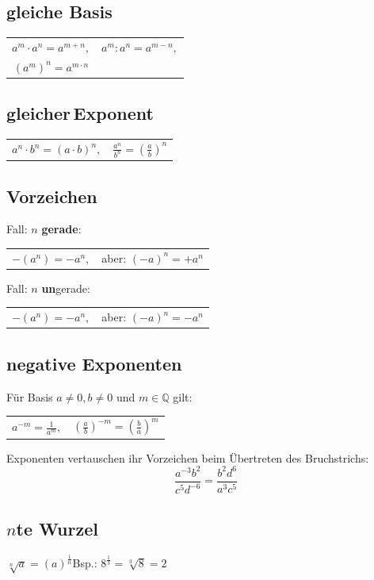 \begin{multicols}{2}
\subsection*{gleiche Basis}
\begin{tabular}{cc}
$a^m\cdot{}a^n = a^{m+n},$ & $a^m:a^n=a^{m-n},$ \\
$\left(a^m\right)^n = a^{m\cdot{}n}$ &
 \end{tabular} 

\subsection*{gleicher\,Exponent}
\begin{tabular}{cc}
$a^n\cdot{}b^n = (a\cdot{}b)^n,$ & $\frac{a^n}{b^n} =\left(\frac{a}b\right)^n $
 \end{tabular}

\subsection*{Vorzeichen}
Fall: $n$ \textbf{gerade}:

\begin{tabular}{cc}
 $-(a^n) = -a^n,$ & aber: $(-a)^n = +a^n$
 \end{tabular} 

Fall: $n$ \textbf{un}gerade:

\begin{tabular}{cc}
 $-(a^n) = -a^n,$ & aber: $(-a)^n = -a^n$
 \end{tabular} 


\subsection*{negative Exponenten}

Für Basis $a\ne 0, b\ne 0$ und $m \in\mathbb{Q}$ gilt:

\begin{tabular}{cc}
$a^{-m} = \frac1{a^m},$ & $\left(\frac{a}b\right)^{-m} = \left(\frac{b}a\right)^m$
 \end{tabular}

Exponenten vertauschen ihr Vorzeichen beim Übertreten des Bruchstrichs:
$$\frac{a^{-3}b^2}{c^5d^{-6}} = \frac{b^2d^6}{a^3c^5}$$


\subsection*{$n$te Wurzel}
$\sqrt[n]{a} = \left(a\right)^\frac1n$\hfill{}Bsp.: $8^{\frac13}=\sqrt[3]{8}=2$


\end{multicols}
